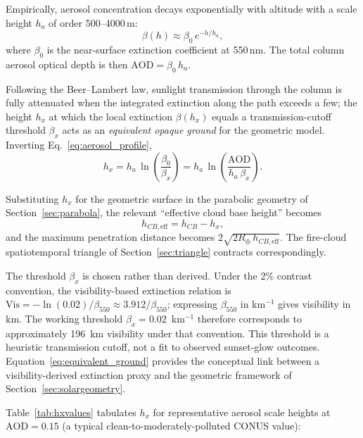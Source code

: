 \documentclass[11pt,a4paper]{article}
\newcommand{\AOD}{\text{AOD}}
\begin{document}
Empirically, aerosol concentration decays exponentially with altitude with a scale height $h_a$ of order 500--4000\,m:
\begin{equation}
\beta(h) \approx \beta_0 \, e^{-h / h_a},
\label{eq:aerosol_profile}
\end{equation}
where $\beta_0$ is the near-surface extinction coefficient at 550\,nm. The total column aerosol optical depth is then $\AOD = \beta_0 \, h_a$.

Following the Beer--Lambert law, sunlight transmission through the column is fully attenuated when the integrated extinction along the path exceeds a few; the height $h_x$ at which the local extinction $\beta(h_x)$ equals a transmission-cutoff threshold $\beta_x$ acts as an \emph{equivalent opaque ground} for the geometric model. Inverting Eq.~\ref{eq:aerosol_profile},
\begin{equation}
h_x = h_a \, \ln\!\left(\frac{\beta_0}{\beta_x}\right) = h_a \, \ln\!\left(\frac{\AOD}{h_a \, \beta_x}\right).
\label{eq:equivalent_ground}
\end{equation}

Substituting $h_x$ for the geometric surface in the parabolic geometry of Section~\ref{sec:parabola}, the relevant ``effective cloud base height'' becomes
\begin{equation}
h_{CB, \text{eff}} = h_{CB} - h_x,
\end{equation}
and the maximum penetration distance becomes $2 \sqrt{2 R_\oplus \, h_{CB, \text{eff}}}$. The fire-cloud spatiotemporal triangle of Section~\ref{sec:triangle} contracts correspondingly.

The threshold $\beta_x$ is chosen rather than derived. Under the 2\% contrast convention, the visibility-based extinction relation is $\text{Vis} = -\ln(0.02) / \beta_{550} \approx 3.912 / \beta_{550}$; expressing $\beta_{550}$ in km$^{-1}$ gives visibility in km. The working threshold $\beta_x = 0.02$~km$^{-1}$ therefore corresponds to approximately 196~km visibility under that convention. This threshold is a heuristic transmission cutoff, not a fit to observed sunset-glow outcomes. Equation~\ref{eq:equivalent_ground} provides the conceptual link between a visibility-derived extinction proxy and the geometric framework of Section~\ref{sec:solargeometry}.

Table~\ref{tab:hxvalues} tabulates $h_x$ for representative aerosol scale heights at $\AOD = 0.15$ (a typical clean-to-moderately-polluted CONUS value):
\end{document}
